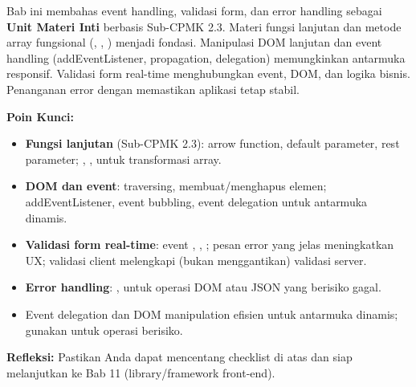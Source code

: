 \documentclass[../main.tex]{subfiles}
\begin{document}
\begin{rangkuman}
Bab ini membahas event handling, validasi form, dan error handling sebagai \textbf{Unit Materi Inti} berbasis Sub-CPMK 2.3. Materi fungsi lanjutan dan metode array fungsional (, , ) menjadi fondasi. Manipulasi DOM lanjutan dan event handling (addEventListener, propagation, delegation) memungkinkan antarmuka responsif. Validasi form real-time menghubungkan event, DOM, dan logika bisnis. Penanganan error dengan  memastikan aplikasi tetap stabil.

\textbf{Poin Kunci:}
\begin{itemize}
  \item \textbf{Fungsi lanjutan} (Sub-CPMK 2.3): arrow function, default parameter, rest parameter; , ,  untuk transformasi array.
  \item \textbf{DOM dan event}: traversing, membuat/menghapus elemen; addEventListener, event bubbling, event delegation untuk antarmuka dinamis.
  \item \textbf{Validasi form real-time}: event , , ; pesan error yang jelas meningkatkan UX; validasi client melengkapi (bukan menggantikan) validasi server.
  \item \textbf{Error handling}: ,  untuk operasi DOM atau JSON yang berisiko gagal.
  \item Event delegation dan DOM manipulation efisien untuk antarmuka dinamis; gunakan  untuk operasi berisiko.
\end{itemize}

\textbf{Refleksi:} Pastikan Anda dapat mencentang checklist di atas dan siap melanjutkan ke Bab 11 (library/framework front-end).
\end{rangkuman}

\ifSubfilesClassLoaded{
  \renewcommand{\bibname}{Daftar Pustaka}
  
  
}{}
\end{document}

